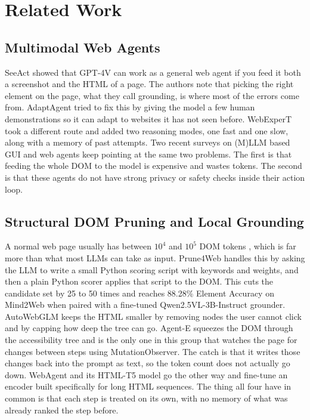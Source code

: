 \section{Related Work}

\subsection{Multimodal Web Agents}
SeeAct \cite{SeeAct} showed that GPT-4V can work as a general web agent if you feed it both a screenshot and the HTML of a page. The authors note that picking the right element on the page, what they call grounding, is where most of the errors come from. AdaptAgent \cite{FewShotLearning:verma2024adaptagentadaptingmultimodalweb} tried to fix this by giving the model a few human demonstrations so it can adapt to websites it has not seen before. WebExperT \cite{Browsinglikehuman:luo2025browsing} took a different route and added two reasoning modes, one fast and one slow, along with a memory of past attempts. Two recent surveys on (M)LLM based GUI and web agents \cite{tang2025surveymllmbasedguiagents,ning2025surveywebagentsnextgenerationai} keep pointing at the same two problems. The first is that feeding the whole DOM to the model is expensive and wastes tokens. The second is that these agents do not have strong privacy or safety checks inside their action loop.

\subsection{Structural DOM Pruning and Local Grounding}
A normal web page usually has between $10^4$ and $10^5$ DOM tokens \cite{zhang2025prune4web}, which is far more than what most LLMs can take as input. Prune4Web \cite{zhang2025prune4web} handles this by asking the LLM to write a small Python scoring script with keywords and weights, and then a plain Python scorer applies that script to the DOM. This cuts the candidate set by 25 to 50 times and reaches 88.28\% Element Accuracy on Mind2Web when paired with a fine-tuned Qwen2.5VL-3B-Instruct grounder. AutoWebGLM \cite{lai2024autowebglm} keeps the HTML smaller by removing nodes the user cannot click and by capping how deep the tree can go. Agent-E \cite{tarsariya2024agente} squeezes the DOM through the accessibility tree and is the only one in this group that watches the page for changes between steps using MutationObserver. The catch is that it writes those changes back into the prompt as text, so the token count does not actually go down. WebAgent and its HTML-T5 model \cite{gur2024webagent} go the other way and fine-tune an encoder built specifically for long HTML sequences. The thing all four have in common is that each step is treated on its own, with no memory of what was already ranked the step before.

